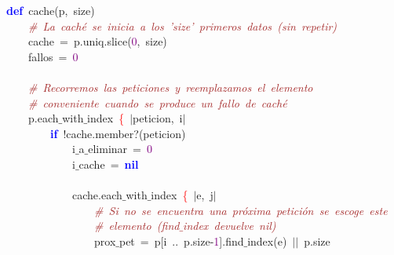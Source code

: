 \noindent
\mbox{}\textbf{\textcolor{Blue}{def}}\ cache\textcolor{BrickRed}{(}p\textcolor{BrickRed}{,}\ size\textcolor{BrickRed}{)} \\
\mbox{}\ \ \ \ \textit{\textcolor{Brown}{\#\ La\ caché\ se\ inicia\ a\ los\ 'size'\ primeros\ datos\ (sin\ repetir)}} \\
\mbox{}\ \ \ \ cache\ \textcolor{BrickRed}{=}\ p\textcolor{BrickRed}{.}uniq\textcolor{BrickRed}{.}slice\textcolor{BrickRed}{(}\textcolor{Purple}{0}\textcolor{BrickRed}{,}\ size\textcolor{BrickRed}{)} \\
\mbox{}\ \ \ \ fallos\ \textcolor{BrickRed}{=}\ \textcolor{Purple}{0} \\
\mbox{} \\
\mbox{}\ \ \ \ \textit{\textcolor{Brown}{\#\ Recorremos\ las\ peticiones\ y\ reemplazamos\ el\ elemento}} \\
\mbox{}\ \ \ \ \textit{\textcolor{Brown}{\#\ conveniente\ cuando\ se\ produce\ un\ fallo\ de\ caché}} \\
\mbox{}\ \ \ \ p\textcolor{BrickRed}{.}each$\_$with$\_$index\ \textcolor{Red}{\{}\ \textcolor{BrickRed}{$|$}peticion\textcolor{BrickRed}{,}\ i\textcolor{BrickRed}{$|$}\  \\
\mbox{}\ \ \ \ \ \ \ \ \textbf{\textcolor{Blue}{if}}\ \textcolor{BrickRed}{!}cache\textcolor{BrickRed}{.}member?\textcolor{BrickRed}{(}peticion\textcolor{BrickRed}{)} \\
\mbox{}\ \ \ \ \ \ \ \ \ \ \ \ i$\_$a$\_$eliminar\ \textcolor{BrickRed}{=}\ \textcolor{Purple}{0} \\
\mbox{}\ \ \ \ \ \ \ \ \ \ \ \ i$\_$cache\ \textcolor{BrickRed}{=}\ \textbf{\textcolor{Blue}{nil}} \\
\mbox{} \\
\mbox{}\ \ \ \ \ \ \ \ \ \ \ \ cache\textcolor{BrickRed}{.}each$\_$with$\_$index\ \textcolor{Red}{\{}\ \textcolor{BrickRed}{$|$}e\textcolor{BrickRed}{,}\ j\textcolor{BrickRed}{$|$} \\
\mbox{}\ \ \ \ \ \ \ \ \ \ \ \ \ \ \ \ \textit{\textcolor{Brown}{\#\ Si\ no\ se\ encuentra\ una\ próxima\ petición\ se\ escoge\ este}} \\
\mbox{}\ \ \ \ \ \ \ \ \ \ \ \ \ \ \ \ \textit{\textcolor{Brown}{\#\ elemento\ (find$\_$index\ devuelve\ nil)}} \\
\mbox{}\ \ \ \ \ \ \ \ \ \ \ \ \ \ \ \ prox$\_$pet\ \textcolor{BrickRed}{=}\ p\textcolor{BrickRed}{[}i\ \textcolor{BrickRed}{..}\ p\textcolor{BrickRed}{.}size\textcolor{BrickRed}{-}\textcolor{Purple}{1}\textcolor{BrickRed}{].}find$\_$index\textcolor{BrickRed}{(}e\textcolor{BrickRed}{)}\ \textcolor{BrickRed}{$|$$|$}\ p\textcolor{BrickRed}{.}size \\
